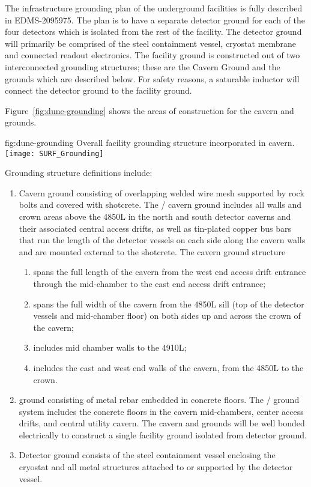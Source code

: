 The infrastructure grounding plan of the underground facilities is
fully described in EDMS-2095975\cite{bib:cernedms2095975}.  The plan is to have a separate
detector ground for each of the four detectors which is isolated from
the rest of the facility.  The detector ground will primarily be
comprised of the steel containment vessel, cryostat membrane and
connected readout electronics.  The facility ground is constructed out
of two interconnected grounding structures; these are the Cavern
Ground and the  grounds which are described below.  For safety
reasons, a saturable inductor will connect the detector ground to the
facility ground.

Figure~\ref{fig:dune-grounding} shows the areas of construction for
the cavern and  grounds.
\begin{dunefigure}{fig:dune-grounding}
  {Overall  facility grounding structure incorporated in cavern.}
  \texttt{[image: SURF\_Grounding]}
\end{dunefigure}
Grounding structure definitions include:
\begin{enumerate}
 \item Cavern ground consisting of overlapping welded wire mesh
   supported by rock bolts and covered with shotcrete. The
   / cavern ground includes all walls and
   crown areas above the 4850L in the north and south detector
   caverns and their associated central access drifts, as well as tin-plated
   copper bus bars that run the length of the detector vessels
   on each side along the cavern walls and are mounted external to the
   shotcrete.  The cavern ground structure
\begin{enumerate}
 \item spans the full length of the cavern from the west end access
   drift entrance through the mid-chamber to the east end access drift
   entrance;
 \item spans the full width of the cavern from the 4850L sill
   (top of the detector vessels and mid-chamber floor) on both sides
   up and across the crown of the cavern;
 \item includes mid chamber walls to the 4910L;
 \item includes the east and west end walls of the cavern, from the
   4850L to the crown.
\end{enumerate}
 \item {} ground consisting of metal rebar embedded in
   concrete floors. The /  ground
   system includes the concrete floors in the cavern mid-chambers,
   center access drifts, and central utility cavern. The cavern and
    grounds will be well bonded electrically to construct
   a single facility ground isolated from detector ground.
 \item Detector ground consists of the steel containment vessel
   enclosing the cryostat and all metal structures attached to or
   supported by the detector vessel.
\end{enumerate}


